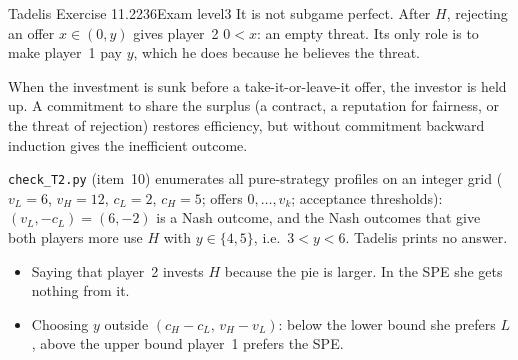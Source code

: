 \begin{exsol}{Tadelis Exercise 11.2}{236}{Exam level}{3}
It is not subgame perfect. After $H$, rejecting an offer $x \in (0, y)$ gives player~2 $0 < x$: an empty
threat. Its only role is to make player~1 pay $y$, which he does because he believes the threat.

\interp When the investment is sunk before a take-it-or-leave-it offer, the investor is held up. A
commitment to share the surplus (a contract, a reputation for fairness, or the threat of rejection)
restores efficiency, but without commitment backward induction gives the inefficient outcome.

\verify \texttt{check\_T2.py} (item~10) enumerates all pure-strategy profiles on an integer grid ($v_L = 6$,
$v_H = 12$, $c_L = 2$, $c_H = 5$; offers $0,\dots,v_k$; acceptance thresholds): $(v_L, -c_L) = (6,-2)$ is a Nash
outcome, and the Nash outcomes that give both players more use $H$ with $y \in \{4, 5\}$, i.e.\ $3 < y < 6$.
Tadelis prints no answer.

\mistakes
\begin{itemize}
  \item Saying that player~2 invests $H$ because the pie is larger. In the SPE she gets nothing from it.
  \item Choosing $y$ outside $(c_H - c_L,\, v_H - v_L)$: below the lower bound she prefers $L$, above the
  upper bound player~1 prefers the SPE.
\end{itemize}

\end{exsol}

